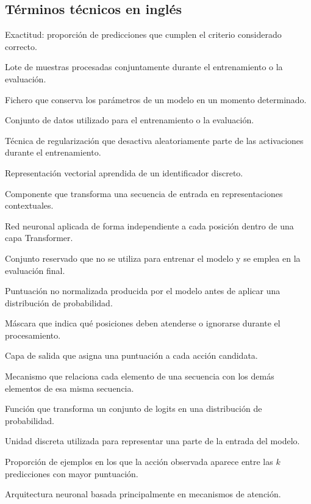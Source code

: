\subsection{Términos técnicos en inglés}

\begin{description}[style=nextline,leftmargin=4.2cm]
    \item[Accuracy] Exactitud: proporción de predicciones que cumplen el criterio considerado correcto.
    \item[Batch] Lote de muestras procesadas conjuntamente durante el entrenamiento o la evaluación.
    \item[Checkpoint] Fichero que conserva los parámetros de un modelo en un momento determinado.
    \item[Dataset] Conjunto de datos utilizado para el entrenamiento o la evaluación.
    \item[Dropout] Técnica de regularización que desactiva aleatoriamente parte de las activaciones durante el entrenamiento.
    \item[Embedding] Representación vectorial aprendida de un identificador discreto.
    \item[Encoder] Componente que transforma una secuencia de entrada en representaciones contextuales.
    \item[Feed-forward] Red neuronal aplicada de forma independiente a cada posición dentro de una capa Transformer.
    \item[Holdout] Conjunto reservado que no se utiliza para entrenar el modelo y se emplea en la evaluación final.
    \item[Logit] Puntuación no normalizada producida por el modelo antes de aplicar una distribución de probabilidad.
    \item[Mask] Máscara que indica qué posiciones deben atenderse o ignorarse durante el procesamiento.
    \item[Policy head] Capa de salida que asigna una puntuación a cada acción candidata.
    \item[Self-attention] Mecanismo que relaciona cada elemento de una secuencia con los demás elementos de esa misma secuencia.
    \item[Softmax] Función que transforma un conjunto de logits en una distribución de probabilidad.
    \item[Token] Unidad discreta utilizada para representar una parte de la entrada del modelo.
    \item[Top-k accuracy] Proporción de ejemplos en los que la acción observada aparece entre las $k$ predicciones con mayor puntuación.
    \item[Transformer] Arquitectura neuronal basada principalmente en mecanismos de atención.
\end{description}
